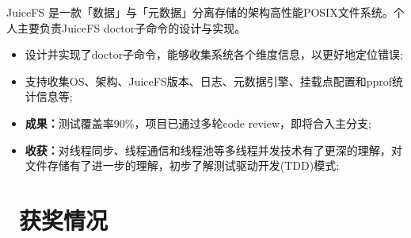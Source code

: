 \documentclass{resume}
\begin{document}
JuiceFS 是一款「数据」与「元数据」分离存储的架构高性能POSIX文件系统。个人主要负责JuiceFS doctor子命令的设计与实现。
\begin{onehalfspacing}
  \begin{itemize}
    \item 设计并实现了doctor子命令，能够收集系统各个维度信息，以更好地定位错误;
    \item 支持收集OS、架构、JuiceFS版本、日志、元数据引擎、挂载点配置和pprof统计信息等;
    \item \textbf{成果：}测试覆盖率90\%，项目已通过多轮code review，即将合入主分支;
    \item \textbf{收获：}对线程同步、线程通信和线程池等多线程并发技术有了更深的理解，对文件存储有了进一步的理解，初步了解测试驱动开发(TDD)模式;
  \end{itemize}
\end{onehalfspacing}


\section{\faHeartO\ 获奖情况}



\end{document}
